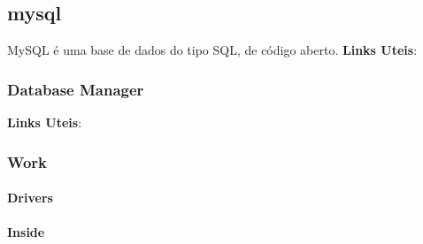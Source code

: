 \subsection{mysql}
MySQL é uma base de dados do tipo SQL, de código aberto.\newline
\textbf{Links Uteis}:
\begin{itemize}
\end{itemize}

\subsubsection{Database Manager}

\textbf{Links Uteis}:
\begin{itemize}
\end{itemize}

\subsubsection{Work}

\paragraph{Drivers}

\paragraph{Inside}
